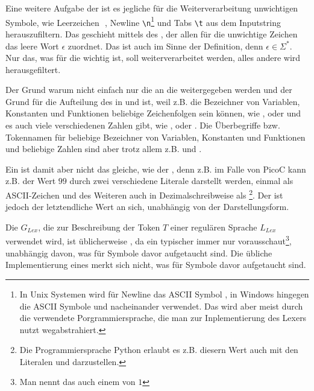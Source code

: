 Eine weitere Aufgabe der  ist es jegliche für die Weiterverarbeitung unwichtigen Symbole, wie Leerzeichen \,\textvisiblespace\,, Newline \verb|\n|\footnote{In Unix Systemen wird für Newline das ASCII Symbol , in Windows hingegen die ASCII Symbole  und  nacheinander verwendet. Das wird aber meist durch die verwendete Porgrammiersprache, die man zur Inplementierung des Lexers nutzt wegabstrahiert.} und Tabs \verb|\t| aus dem Inputstring herauszufiltern. Das geschieht mittels des , der allen für die  unwichtige Zeichen das leere Wort $\epsilon$ zuordnet. Das ist auch im Sinne der Definition, denn $\epsilon \in \Sigma^{*}$.
Nur das, was für die  wichtig ist, soll weiterverarbeitet werden, alles andere wird herausgefiltert.

Der Grund warum nicht einfach nur die  an die  weitergegeben werden und der Grund für die Aufteilung des  in  und  ist, weil z.B. die Bezeichner von Variablen, Konstanten und Funktionen beliebige Zeichenfolgen sein können, wie ,  oder  und es auch viele verschiedenen Zahlen gibt, wie ,  oder . Die Überbegriffe bzw. Tokennamen für beliebige Bezeichner von Variablen, Konstanten und Funktionen und beliebige Zahlen sind aber trotz allem z.B.  und .

Ein  ist damit aber nicht das gleiche, wie der , denn z.B. im Falle von PicoC kann z.B. der Wert $99$ durch zwei verschiedene Literale darstellt werden, einmal als ASCII-Zeichen  und des Weiteren auch in Dezimalschreibweise als \footnote{Die Programmiersprache Python erlaubt es z.B. diesern Wert auch mit den Literalen  und  darzustellen.}. Der  ist jedoch der letztendliche Wert an sich, unabhängig von der Darstellungsform.

  Die  $G_{Lex}$, die zur Beschreibung der Token $T$ einer regulären Sprache $L_{Lex}$ verwendet wird, ist üblicherweise , da ein typischer  immer nur  vorausschaut\footnote{Man nennt das auch einem  von $1$}, unabhängig davon, was für Symbole davor aufgetaucht sind. Die übliche Implementierung eines  merkt sich nicht, was für Symbole davor aufgetaucht sind.

